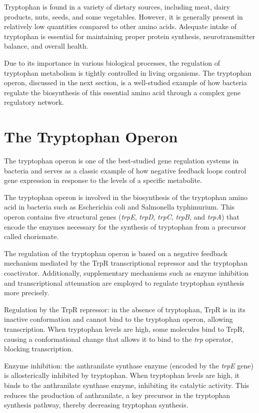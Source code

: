 Tryptophan is found in a variety of dietary sources, including meat, dairy products, nuts, seeds, and some vegetables. However, it is generally present in relatively low quantities compared to other amino acids. Adequate intake of tryptophan is essential for maintaining proper protein synthesis, neurotransmitter balance, and overall health.

Due to its importance in various biological processes, the regulation of tryptophan metabolism is tightly controlled in living organisms. The tryptophan operon, discussed in the next section, is a well-studied example of how bacteria regulate the biosynthesis of this essential amino acid through a complex gene regulatory network. 

\section{The Tryptophan Operon}

The tryptophan operon is one of the best-studied gene regulation systems in bacteria and serves as a classic example of how negative feedback loops control gene expression in response to the levels of a specific metabolite.

The tryptophan operon is involved in the biosynthesis of the tryptophan amino acid in bacteria such as Escherichia coli and Salmonella typhimurium. This operon contains five structural genes (\emph{trpE}, \emph{trpD}, \emph{trpC}, \emph{trpB}, and \emph{trpA}) that encode the enzymes necessary for the synthesis of tryptophan from a precursor called chorismate.

The regulation of the tryptophan operon is based on a negative feedback mechanism mediated by the TrpR transcriptional repressor and the tryptophan coactivator. Additionally, supplementary mechanisms such as enzyme inhibition and transcriptional attenuation are employed to regulate tryptophan synthesis more precisely.

Regulation by the TrpR repressor: in the absence of tryptophan, TrpR is in its inactive conformation and cannot bind to the tryptophan operon, allowing transcription. When tryptophan levels are high, some molecules bind to TrpR, causing a conformational change that allows it to bind to the \emph{trp} operator, blocking transcription.

Enzyme inhibition: the anthranilate synthase enzyme (encoded by the \emph{trpE} gene) is allosterically inhibited by tryptophan. When tryptophan levels are high, it binds to the anthranilate synthase enzyme, inhibiting its catalytic activity. This reduces the production of anthranilate, a key precursor in the tryptophan synthesis pathway, thereby decreasing tryptophan synthesis.


